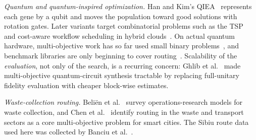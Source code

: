 \emph{Quantum and quantum-inspired optimization.} Han and Kim's
QIEA~\cite{han2002qea} represents each gene by a qubit and moves the population
toward good solutions with rotation gates. Later variants target combinatorial
problems such as the TSP~\cite{ma2024qeatsp} and cost-aware workflow scheduling in
hybrid clouds~\cite{hussain2024costaware}. On actual quantum hardware, multi-objective
work has so far used small binary problems~\cite{kotil2025qamoo,king2025moqa}, and
benchmark libraries are only beginning to cover routing~\cite{koch2026qoblib}.
Scalability of the \emph{evaluation}, not only of the search, is a recurring
concern: Ghlib et al.~\cite{ghlib2026scalable} made multi-objective quantum-circuit
synthesis tractable by replacing full-unitary fidelity evaluation with cheaper
block-wise estimates.

\emph{Waste-collection routing.} Beliën et al.~\cite{belien2014waste} survey
operations-research models for waste collection, and Chen et
al.~\cite{chen2025smartcities} identify routing in the waste and transport sectors
as a core multi-objective problem for smart cities. The Sibiu route data used here
was collected by Banciu et al.~\cite{banciu2025iot}.
